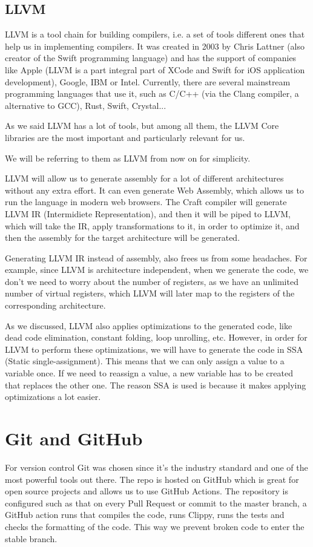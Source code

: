 ﻿\documentclass[10pt,a4paper,twocolumn,twoside]{article}
\begin{document}
\subsection{LLVM}
LLVM is a tool chain for building compilers, i.e. a set of tools different ones
that help us in implementing compilers. It was created in 2003 by Chris Lattner
(also creator of the Swift programming language) and has the support of
companies like Apple (LLVM is a part integral part of XCode and Swift for iOS
application development), Google, IBM or Intel. Currently, there are several
mainstream programming languages that use it, such as C/C++ (via the Clang
compiler, a alternative to GCC), Rust, Swift, Crystal...

As we said LLVM has a lot of tools, but among all them, the LLVM Core libraries
are the most important and particularly relevant for us. 

We will be referring to 
them as LLVM from now on for simplicity. 

LLVM will allow us to generate assembly for a lot of different architectures
without any extra effort. It can even generate Web Assembly, which allows us to
run the language in modern web browsers. The Craft compiler will generate LLVM
IR (Intermidiete Representation), and then it will be piped to LLVM, which will
take the IR, apply transformations to it, in order to optimize it, and then
the assembly for the target architecture will be generated.

Generating LLVM IR instead of assembly, also frees us from some headaches. For
example, since LLVM is architecture independent, when we generate the code, we
don't we need to worry about the number of registers, as we have an unlimited
number of virtual registers, which LLVM will later map to the registers of the
corresponding architecture.

As we discussed, LLVM also applies optimizations to the generated code, like
dead code elimination, constant folding, loop unrolling, etc. However, in order
for LLVM to perform these optimizations, we will have to generate the code in
SSA (Static single-assignment). This means that we can only assign a value to a
variable once. If we need to reassign a value, a new variable has to be created
that replaces the other one. The reason SSA is used is because it makes 
applying optimizations a lot easier.

\section{Git and GitHub}
For version control Git was chosen since it's the industry standard and one of
the most powerful tools out there. The repo is hosted on GitHub which is great
for open source projects and allows us to use GitHub Actions. The repository is 
configured such as that on every Pull Request or commit to the master branch,
a GitHub action runs that compiles the code, runs Clippy, runs the tests and 
checks the formatting of the code. This way we prevent broken code to enter the
stable branch.
\end{document}
